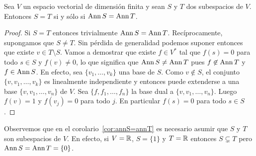 \begin{cor}
	\label{cor:annS=annT}
    Sea $V$ un espacio vectorial de dimensión finita y sean $S$ y $T$ dos
    subespacios de $V$. Entonces $S=T$ si y sólo si $\operatorname{Ann} S=\operatorname{Ann} T$.

	\begin{proof}
		Si $S=T$ entonces trivialmente $\operatorname{Ann} S=\operatorname{Ann} T$. Recíprocamente,
		supongamos que $S\ne T$. Sin pérdida de generalidad podemos suponer
		entonces que existe $v\in T\setminus S$. Vamos a demostrar que existe
		$f\in V^*$ tal que $f(s)=0$ para todo $s\in S$ y $f(v)\ne0$, lo que
		significa que $\operatorname{Ann} S\ne\operatorname{Ann} T$ pues $f\not\in\operatorname{Ann} T$ y $f\in\operatorname{Ann} S$.
		En efecto, sea $\{v_1,\dots,v_k\}$ una base de $S$. Como $v\not\in S$,
		el conjunto $\{v,v_1,\dots,v_k\}$ es linealmente independiente y
		entonces puede extenderse a una base $\{v,v_1,\dots,v_n\}$ de $V$. Sea
		$\{f,f_1,\dots,f_n\}$ la base dual a $\{v,v_1,\dots,v_n\}$. Luego
		$f(v)=1$ y $f(v_j)=0$ para todo $j$. En particular $f(s)=0$ para todo
		$s\in S$. 
	\end{proof}
\end{cor}

\begin{block}
	Observemos que en el corolario~\ref{cor:annS=annT} es necesario asumir que
	$S$ y $T$ son subespacios de $V$. En efecto, si $V=\mathbb{R}$, $S=\{1\}$ y $T=\mathbb{R}$
	entonces $S\subsetneq T$ pero $\operatorname{Ann} S=\operatorname{Ann} T=\{0\}$. 
\end{block}

